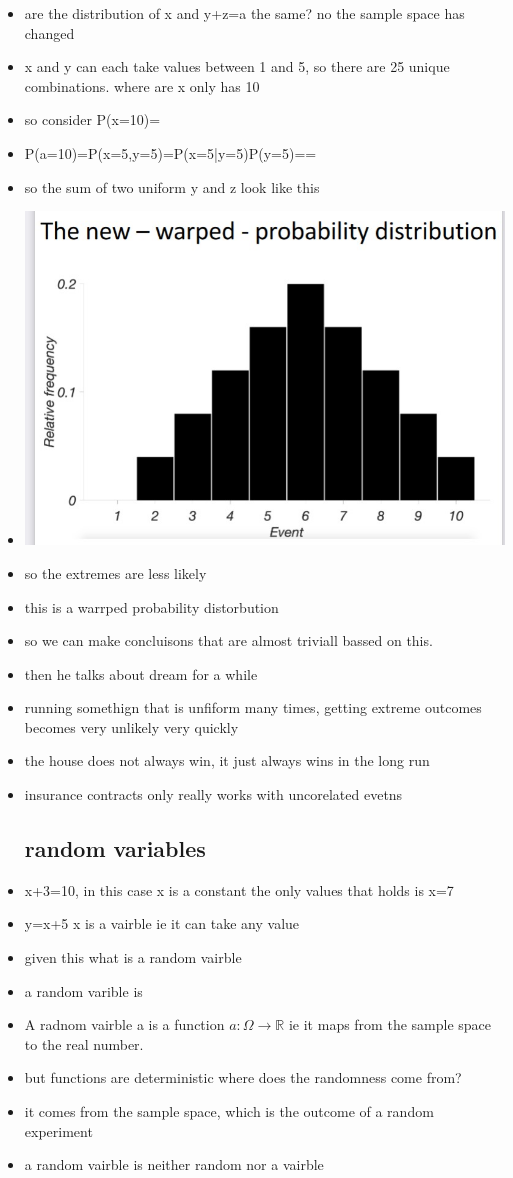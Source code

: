\documentclass{article}
\begin{document}
\begin{itemize}
\item are the distribution of x and y+z=a the same? no the sample space has changed 
\item x and y can each take values between 1 and 5, so there are 25 unique combinations. where are x only has 10
\item so consider P(x=10)=
\item P(a=10)=P(x=5,y=5)=P(x=5|y=5)P(y=5)==
\item so the sum of two uniform y and z look like this 
\item \includegraphics[width=15cm]{Final_Review/Lecture_2/two_uniform.jpg}
\item so the extremes are less likely 
\item this is a warrped probability distorbution 
\item so we can make concluisons that are almost triviall bassed on this. 
\item then he talks about dream for a while
\item running somethign that is unfiform many times, getting extreme outcomes becomes very unlikely very quickly 
\item the house does not always win, it just always wins in the long run 
\item insurance contracts only really works with uncorelated evetns
\subsection{random variables}
\item x+3=10, in this case x is a constant the only values that holds is x=7
\item y=x+5 x is a vairble ie it can take any value
\item given this what is a random vairble 
\item a random varible is 
\item A radnom vairble a is a function $a:\Omega\rightarrow \mathbb{R}$ ie it maps from the sample space to the real number. 
\item but functions are deterministic where does the randomness come from? 
\item it comes from the sample space, which is the outcome of a random experiment  
\item a random vairble is neither random nor a vairble 

\end{itemize}
\end{document}
